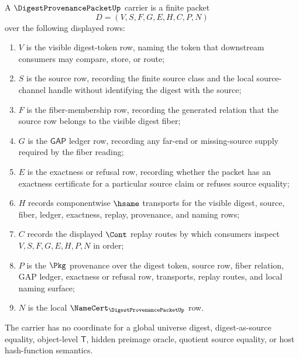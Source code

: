 \begin{definition}
\label{def:digest-provenance-packet-carrier}
A $\DigestProvenancePacketUp$ carrier is a finite packet
$$
D=(V,S,F,G,E,H,C,P,N)
$$
over the following displayed rows:
\begin{enumerate}
\item $V$ is the visible digest-token row, naming the token that downstream consumers may compare, store, or route;
\item $S$ is the source row, recording the finite source class and the local source-channel handle without identifying the digest with the source;
\item $F$ is the fiber-membership row, recording the generated relation that the source row belongs to the visible digest fiber;
\item $G$ is the $\mathsf{GAP}$ ledger row, recording any far-end or missing-source supply required by the fiber reading;
\item $E$ is the exactness or refusal row, recording whether the packet has an exactness certificate for a particular source claim or refuses source equality;
\item $H$ records componentwise $\hsame$ transports for the visible digest, source, fiber, ledger, exactness, replay, provenance, and naming rows;
\item $C$ records the displayed $\Cont$ replay routes by which consumers inspect $V,S,F,G,E,H,P,N$ in order;
\item $P$ is the $\Pkg$ provenance over the digest token, source row, fiber relation, GAP ledger, exactness or refusal row, transports, replay routes, and local naming surface;
\item $N$ is the local $\NameCert_{\DigestProvenancePacketUp}$ row.
\end{enumerate}
The carrier has no coordinate for a global universe digest, digest-as-source equality, object-level $\mathsf{T}$, hidden preimage oracle, quotient source equality, or host hash-function semantics.
\end{definition}


